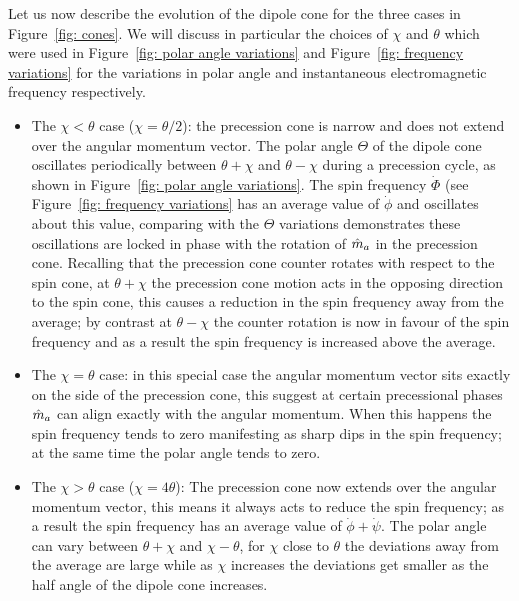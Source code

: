 \documentclass[../full_thesis/full_thesis.tex]{subfiles}
\begin{document}
Let us now describe
the evolution of the dipole cone for the three cases in Figure~\ref{fig: cones}.
We will discuss in particular the choices of $\chi$ and $\theta$ which were used
in Figure~\ref{fig: polar angle variations} and Figure~\ref{fig: frequency variations}
for the variations in polar angle and instantaneous electromagnetic frequency
respectively.
\begin{itemize}
\item The $\chi < \theta$ case ($\chi = \theta/2$): the precession cone is
narrow and does not extend over the angular momentum vector. The polar angle
$\Theta$ of the dipole cone oscillates periodically between $\theta+\chi$ and
$\theta-\chi$ during a precession cycle, as shown in Figure~\ref{fig: polar angle
variations}.  The spin frequency $\dot{\Phi}$ (see Figure~\ref{fig: frequency
variations} has an average value of $\dot{\phi}$ and oscillates about this
value, comparing with the $\Theta$ variations demonstrates these oscillations
are locked in phase with the rotation of $\hat{m}_a$ in the precession cone. Recalling
that the precession cone counter rotates with respect to the spin cone, at
$\theta+\chi$ the precession cone motion acts in the opposing direction to the
spin cone, this causes a reduction in the spin frequency away from the average;
by contrast at $\theta-\chi$ the counter rotation is now in favour of the spin
frequency and as a result the spin frequency is increased above the average.

\item The $\chi = \theta$ case: in this special case the angular momentum vector sits exactly
on the side of the precession cone, this suggest at certain precessional phases $\hat{m}_a$ can align exactly with
the angular momentum. When this happens the spin frequency tends to zero manifesting as sharp dips in the
spin frequency; at the same time the polar angle tends to zero.

\item The $\chi > \theta$ case ($\chi = 4\theta$): The precession cone now extends over the
angular momentum vector, this means it always acts to reduce the spin
frequency; as a result the spin frequency has an average value of
$\dot{\phi} + \dot{\psi}$. The polar angle can vary between $\theta+\chi$ and
$\chi-\theta$, for $\chi$ close to $\theta$ the deviations away from the
average are large while as $\chi$ increases the deviations get smaller as
the half angle of the dipole cone increases.
\end{itemize}
\end{document}
